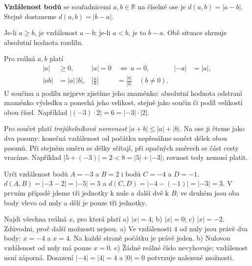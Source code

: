 \documentclass[11pt,a4paper]{article}
\begin{document}
\newpage
{}
\begin{definiceBox}[title={Definice - Vzdálenost bodů na číselné ose}]
\textbf{Vzdálenost bodů} se souřadnicemi $a,b\in\mathbb R$ na číselné ose
je $d(a,b)=|a-b|$. Stejně dostaneme $d(a,b)=|b-a|$.
\end{definiceBox}

Je-li $a\ge b$, je vzdálenost $a-b$; je-li $a<b$, je to $b-a$.
Obě situace shrnuje absolutní hodnota rozdílu.

Pro reálná $a,b$ platí
\begin{align*}
|a|&\ge0, & |a|=0&\ \Leftrightarrow\ a=0, &|-a|&=|a|,\\
|ab|&=|a|\,|b|, & \left|\frac ab\right|&=\frac{|a|}{|b|}\quad(b\ne0).
\end{align*}
U součinu a podílu nejprve zjistíme jeho znaménko: absolutní hodnota
odstraní znaménko výsledku a ponechá jeho velikost, stejně jako součin
či podíl velikostí obou čísel. Například
$|(-3)\cdot2|=6=|-3|\cdot|2|$.

Pro součet platí \emph{trojúhelníková nerovnost}
$|a+b|\le|a|+|b|$.
Na ose ji čteme jako dva posuny: konečná vzdálenost od počátku
nepřesáhne součet délek obou posunů. Při stejném směru se délky
sčítají, při opačných směrech se část cesty vracíme.
Například $|5+(-3)|=2<8=|5|+|-3|$; rovnost tedy nemusí platit.

\begin{prikladReseniBox}[title={Příklad 3},breakable=false]
Urči vzdálenost bodů $A=-3$ a $B=2$ i bodů $C=-4$ a $D=-1$.
\tcblower
$d(A,B)=|-3-2|=|-5|=5$ a $d(C,D)=|-4-(-1)|=|-3|=3$.
V prvním případě jdeme tři jednotky k nule a další dvě k $B$;
ve druhém jsou oba body vlevo od nuly a dělí je pouze tři jednotky.
\begin{center}
\end{center}
\end{prikladReseniBox}

\begin{prikladReseniBox}[title={Příklad 4},breakable=false]
Najdi všechna reálná $x$, pro která platí a) $|x|=4$;
b) $|x|=0$; c) $|x|=-2$. Zdůvodni, proč další možnosti nejsou.
\tcblower
a) Ve vzdálenosti $4$ od nuly jsou právě dva body: $x=-4$ a $x=4$.
Na každé straně počátku je právě jeden.
b) Nulovou vzdálenost od nuly má pouze $x=0$.
c) Žádné reálné číslo nevyhovuje; vzdálenost není záporná.
Dosazení $|-4|=|4|=4$ a $|0|=0$ potvrzuje nalezené možnosti.
\end{prikladReseniBox}
\end{document}
